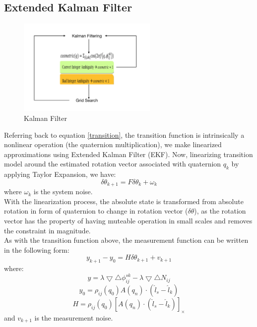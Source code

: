 \documentclass[journal,onecolumn]{IEEEtran}
\begin{document}
\subsection{Extended Kalman Filter}
\begin{figure}
  \centering
  \captionsetup{justification=centering}
  \includegraphics[width=0.6\textwidth]{fig/kalman.png}
  \caption{Kalman Filter}
  \label{kalman}
\end{figure}
Referring back to equation \ref{transition}, the transition function is intrinsically
a nonlinear operation (the quaternion multiplication),
we make linearized approximations using Extended Kalman Filter (EKF).
Now, linearizing transition model around the estimated rotation vector
associated with quaternion $q_k$ by applying Taylor Expansion, we have:
\begin{equation}
  \delta \theta_{k+1} = F \delta \theta_{k} + \omega_k
\end{equation}
where $\omega_k$ is the system noise.\\
With the linearization process, the absolute state is transformed from absolute
rotation in form of quaternion to change in rotation vector ($\delta \theta$),
as the rotation vector has the property of having muteable operation in small scales and
removes the constraint in magnitude.\\
As with the transition function above, the measurement function can be written
in the following form:\\
\begin{equation}
  y_{k+1}-y_0 = H\delta \theta_{k+1} + v_{k+1}
\end{equation}
where:
\begin{equation}
  y = \lambda \bigtriangledown \bigtriangleup \phi_{ij}^{sk} -
  \lambda\bigtriangledown \bigtriangleup N_{ij}
\end{equation}
\begin{equation}
  y_0 = \rho_{ij}(q_0)A(q_n)\cdot(\hat{l}_s-\hat{l}_k)
\end{equation}
\begin{equation}
  H = \rho_{ij}(q_0)[A(q_n)\cdot(\hat{l}_s-\hat{l}_k)]_{\times}
\end{equation}
and $v_{k+1}$ is the measurement noise.\\
\end{document}
